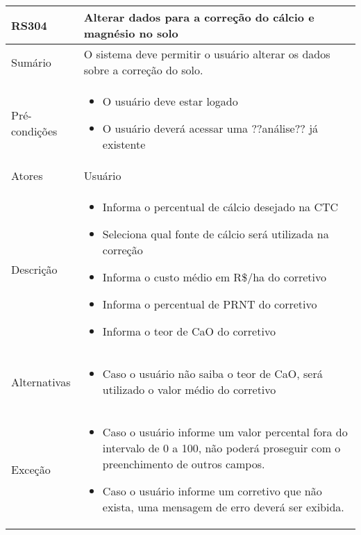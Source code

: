 \begin{quadro}[!htb]
    \begin{tabular}{|p{3cm}|p{11cm}|}
        \hline
        \textbf{RS304} & \textbf{Alterar dados para a correção do cálcio e magnésio no solo} \\
        \hline
        Sumário        & O sistema deve permitir o usuário alterar os dados sobre a correção do solo.                  \\
        \hline
        Pré-condições  & \begin{itemize}
            \item O usuário deve estar logado
            \item O usuário deverá acessar uma ??análise?? já existente 
        \end{itemize}                 \\
        \hline
        Atores         & Usuário                  \\
        \hline
        Descrição      &
        \begin{itemize}
            \item Informa o percentual de cálcio desejado na CTC
            \item Seleciona qual fonte de cálcio será utilizada na correção
            \item Informa o custo médio em R\$/ha do corretivo
            \item Informa o percentual de PRNT do corretivo
            \item Informa o teor de CaO do corretivo
        \end{itemize}                 \\
        \hline
        Alternativas   &
        \begin{itemize}
            \item Caso o usuário não saiba o teor de CaO, será utilizado o valor médio do corretivo
        \end{itemize}                 \\
        \hline
        Exceção        &
        \begin{itemize}
            \item Caso o usuário informe um valor percental fora do intervalo de 0 a 100, não poderá proseguir com o preenchimento de outros campos.
            \item Caso o usuário informe um corretivo que não exista, uma mensagem de erro deverá ser exibida.
        \end{itemize}                   \\
        \hline
    \end{tabular}
\end{quadro}

